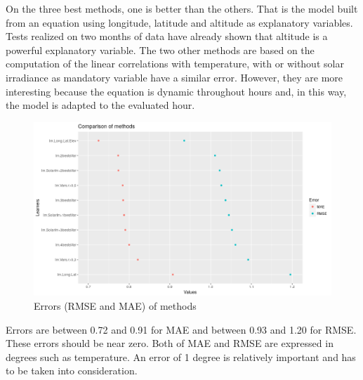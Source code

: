 \documentclass[12pt,twoside]{reedthesis}
\theoremstyle{definition}
\theoremstyle{definition}
\theoremstyle{definition}
\theoremstyle{remark}
\begin{document}
On the three best methods, one is better than the others. That is the
model built from an equation using longitude, latitude and altitude as
explanatory variables. Tests realized on two months of data have already
shown that altitude is a powerful explanatory variable. The two other
methods are based on the computation of the linear correlations with
temperature, with or without solar irradiance as mandatory variable have
a similar error. However, they are more interesting because the equation
is dynamic throughout hours and, in this way, the model is adapted to
the evaluated hour.
\begin{figure}

{\centering \includegraphics[width=1\linewidth]{figure/meanerror} 

}

\caption{Errors (RMSE and MAE) of methods}\label{fig:meanerror}
\end{figure}
Errors are between 0.72 and 0.91 for MAE and between 0.93 and 1.20 for
RMSE. These errors should be near zero. Both of MAE and RMSE are
expressed in degrees such as temperature. An error of 1 degree is
relatively important and has to be taken into consideration.
\end{document}
